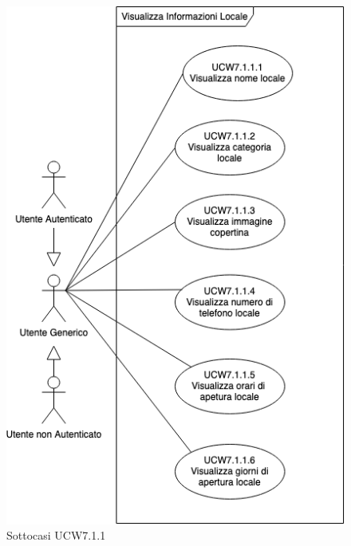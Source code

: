 \begin{figure}[H]
    \centering
        \includegraphics[scale=0.5]{UC_images/UCW7-1-1-x.png}
        \caption{Sottocasi UCW7.1.1}
\end{figure}

